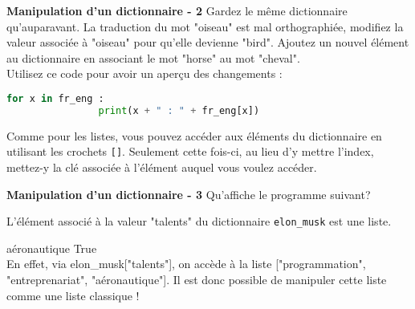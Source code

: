     \begin{Exercice}[5 minutes] \textbf{Manipulation d'un dictionnaire - 2}
       Gardez le même dictionnaire qu'auparavant. La traduction du mot "oiseau" est mal orthographiée, modifiez la valeur associée à "oiseau" pour qu'elle devienne "bird". Ajoutez un nouvel élément au dictionnaire en associant le mot "horse" au mot "cheval". \\
       
       Utilisez ce code pour avoir un aperçu des changements : \\
       
       \begin{lstlisting}[language=Python]
            for x in fr_eng :
    			print(x + " : " + fr_eng[x])   \end{lstlisting}
    
        \begin{conseil}
            Comme pour les listes, vous pouvez accéder aux éléments du dictionnaire en utilisant les crochets \lstinline{[]}. Seulement cette fois-ci, au lieu d'y mettre l'index, mettez-y la clé associée à l'élément auquel vous voulez accéder.
        \end{conseil}
        
        \begin{solution}
             
        \end{solution}
    \end{Exercice}
    
    \begin{Exercice}[5 minutes] \textbf{Manipulation d'un dictionnaire - 3}
      	Qu'affiche le programme suivant? \\
       
      	 
    
        \begin{conseil}
            L'élément associé à la valeur "talents" du dictionnaire \lstinline{elon_musk} est une liste.
        \end{conseil}
        
        \begin{solution}
            aéronautique 
            True \\
            
            En effet, via elon\_musk["talents"], on accède à la liste ["programmation", "entreprenariat", "aéronautique"]. Il est donc possible de manipuler cette liste comme une liste classique !
        \end{solution}
    \end{Exercice}
    
